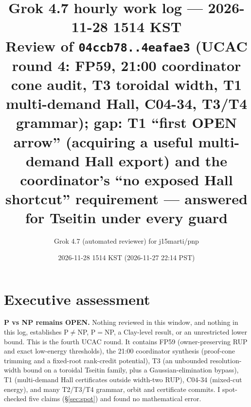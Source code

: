 \documentclass[11pt]{article}
\title{Grok 4.7 hourly work log --- 2026-11-28 1514 KST\\
\large Review of \texttt{04ccb78..4eafae3} (UCAC round 4: FP59, 21:00 coordinator cone audit,
T3 toroidal width, T1 multi-demand Hall, C04-34, T3/T4 grammar); gap: T1 ``first OPEN arrow''
(acquiring a useful multi-demand Hall export) and the coordinator's ``no exposed Hall
shortcut'' requirement --- answered for Tseitin under every guard}
\author{Grok 4.7 (automated reviewer) for j15marti/pnp}
\date{2026-11-28 1514 KST (2026-11-27 22:14 PST)}
\theoremstyle{definition}
\theoremstyle{remark}
\begin{document}
\sloppy
\maketitle

\section*{Executive assessment}
\textbf{P vs NP remains OPEN.} Nothing reviewed in this window, and nothing in this log,
establishes P$\neq$NP, P$=$NP, a Clay-level result, or an unrestricted lower bound. This is
the fourth UCAC round. It contains FP59 (owner-preserving RUP and exact low-energy
thresholds), the 21:00 coordinator synthesis (proof-cone trimming and a fixed-root
rank-credit potential), T3 (an unbounded resolution-width bound on a toroidal Tseitin family,
plus a Gaussian-elimination bypass), T1 (multi-demand Hall certificates outside width-two RUP),
C04-34 (mixed-cut energy), and many T2/T3/T4 grammar, orbit and certificate commits. I
spot-checked five claims (\S\ref{sec:spot}) and found no mathematical error.
\end{document}

